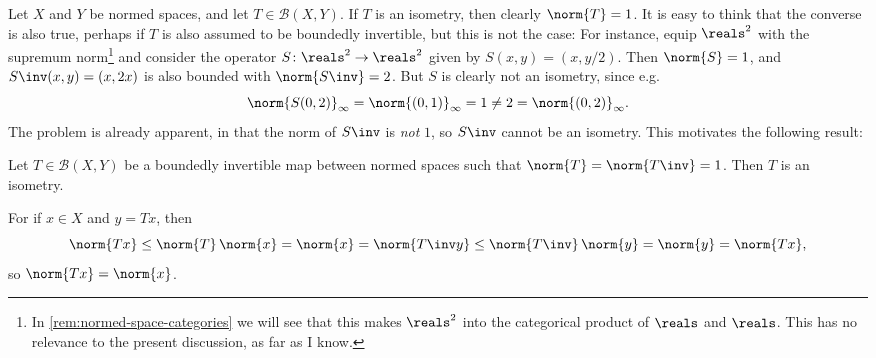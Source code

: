 \documentclass[article, a4paper, 11pt, oneside]{memoir}
\numberwithin{equation}{chapter}
\newcommand{\calB}{\mathcal{B}}
\newenvironment{displaytheorem}{%
	\begin{displayquote}\itshape%
}{%
	\end{displayquote}%
}
\theoremstyle{nonumberplain}
\begin{document}
\begin{remark}
	\label{rem:isometry-norm}
	Let $X$ and $Y$ be normed spaces, and let $T \in \calB(X,Y)$. If $T$ is an isometry, then clearly $\norm{T} = 1$. It is easy to think that the converse is also true, perhaps if $T$ is also assumed to be boundedly invertible, but this is not the case: For instance, equip $\reals^2$ with the supremum norm\footnote{In \cref{rem:normed-space-categories} we will see that this makes $\reals^2$ into the categorical product of $\reals$ and $\reals$. This has no relevance to the present discussion, as far as I know.} and consider the operator $S \colon \reals^2 \to \reals^2$ given by $S(x,y) = (x,y/2)$. Then $\norm{S} = 1$, and $S\inv(x,y) = (x,2x)$ is also bounded with $\norm{S\inv} = 2$. But $S$ is clearly not an isometry, since e.g.
	\begin{equation*}
		\norm{S(0,2)}_\infty
			= \norm{(0,1)}_\infty
			= 1
			\neq 2
			= \norm{(0,2)}_\infty.
	\end{equation*}
	The problem is already apparent, in that the norm of $S\inv$ is \emph{not} $1$, so $S\inv$ cannot be an isometry. This motivates the following result:
	\begin{displaytheorem}
		Let $T \in \calB(X,Y)$ be a boundedly invertible map between normed spaces such that $\norm{T} = \norm{T\inv} = 1$. Then $T$ is an isometry.
	\end{displaytheorem}
	For if $x \in X$ and $y = Tx$, then
	\begin{equation*}
		\norm{Tx}
			\leq \norm{T} \, \norm{x}
			= \norm{x}
			= \norm{T\inv y}
			\leq \norm{T\inv} \, \norm{y}
			= \norm{y}
			= \norm{Tx},
	\end{equation*}
	so $\norm{Tx} = \norm{x}$.
\end{remark}
\end{document}
